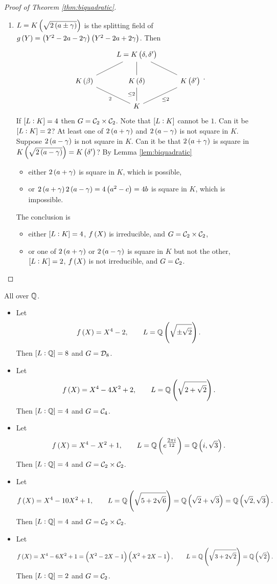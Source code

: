 \begin{proof}[Proof of Theorem \ref{thm:biquadratic}]
\begin{enumerate}
\item $ L = K\br{\sqrt{2\br{a \pm \gamma}}} $ is the splitting field of $ g\br{Y} = \br{Y^2 - 2a - 2\gamma}\br{Y^2 - 2a + 2\gamma} $. Then
$$
\begin{tikzcd}
& L = K\br{\delta, \delta'} & \\
K\br{\beta} \arrow[dash]{ur} & K\br{\delta} \arrow[dash]{u} & K\br{\delta'} \arrow[dash, swap]{ul} \\
& K \arrow[dash]{ul}{2} \arrow[dash]{u}{\le 2} \arrow[dash, swap]{ur}{\le 2} &
\end{tikzcd}.
$$
If $ \sbr{L : K} = 4 $ then $ G = \mathcal{C}_2 \times \mathcal{C}_2 $. Note that $ \sbr{L : K} $ cannot be $ 1 $. Can it be $ \sbr{L : K} = 2 $? At least one of $ 2\br{a + \gamma} $ and $ 2\br{a - \gamma} $ is not square in $ K $. Suppose $ 2\br{a - \gamma} $ is not square in $ K $. Can it be that $ 2\br{a + \gamma} $ is square in $ K\br{\sqrt{2\br{a - \gamma}}} = K\br{\delta'} $? By Lemma \ref{lem:biquadratic}
\begin{itemize}
\item either $ 2\br{a + \gamma} $ is square in $ K $, which is possible,
\item or $ 2\br{a + \gamma}2\br{a - \gamma} = 4\br{a^2 - c} = 4b $ is square in $ K $, which is impossible.
\end{itemize}
The conclusion is
\begin{itemize}
\item either $ \sbr{L : K} = 4 $, $ f\br{X} $ is irreducible, and $ G = \mathcal{C}_2 \times \mathcal{C}_2 $,
\item or one of $ 2\br{a + \gamma} $ or $ 2\br{a - \gamma} $ is square in $ K $ but not the other, $ \sbr{L : K} = 2 $, $ f\br{X} $ is not irreducible, and $ G = \mathcal{C}_2 $.
\end{itemize}
\end{enumerate}
\end{proof}

\begin{example*}
All over $ \mathbb{Q} $.
\begin{itemize}
\item Let
$$ f\br{X} = X^4 - 2, \qquad L = \QQ\br{\sqrt{\pm\sqrt{2}}}. $$
Then $ \sbr{L : \QQ} = 8 $ and $ G = \mathcal{D}_8 $.
\item Let
$$ f\br{X} = X^4 - 4X^2 + 2, \qquad L = \QQ\br{\sqrt{2 + \sqrt{2}}}. $$
Then $ \sbr{L : \QQ} = 4 $ and $ G = \mathcal{C}_4 $.
\item Let
$$ f\br{X} = X^4 - X^2 + 1, \qquad L = \QQ\br{e^{\tfrac{2\pi i}{12}}} = \QQ\br{i, \sqrt{3}}. $$
Then $ \sbr{L : \QQ} = 4 $ and $ G = \mathcal{C}_2 \times \mathcal{C}_2 $.
\item Let
$$ f\br{X} = X^4 - 10X^2 + 1, \qquad L = \QQ\br{\sqrt{5 + 2\sqrt{6}}} = \QQ\br{\sqrt{2} + \sqrt{3}} = \QQ\br{\sqrt{2}, \sqrt{3}}. $$
Then $ \sbr{L : \QQ} = 4 $ and $ G = \mathcal{C}_2 \times \mathcal{C}_2 $.
\item Let
$$ f\br{X} = X^4 - 6X^2 + 1 = \br{X^2 - 2X - 1}\br{X^2 + 2X - 1}, \qquad L = \QQ\br{\sqrt{3 + 2\sqrt{2}}} = \QQ\br{\sqrt{2}}. $$
Then $ \sbr{L : \QQ} = 2 $ and $ G = \mathcal{C}_2 $.
\end{itemize}
\end{example*}

